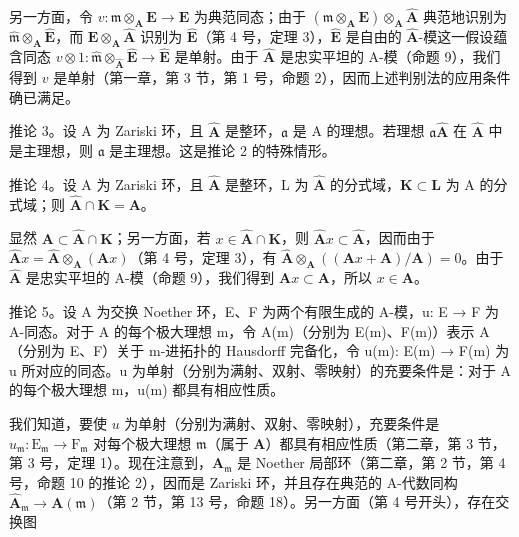另一方面，令 \(v: \mathfrak{m} \otimes_{\mathbf{A}} \mathbf{E} \to \mathbf{E}\) 为典范同态；由于 \((\mathfrak{m} \otimes_{\mathbf{A}} \mathbf{E}) \otimes_{\mathbf{A}} \hat{\mathbf{A}}\) 典范地识别为 \(\hat{\mathfrak{m}} \otimes_{\mathbf{A}} \hat{\mathbf{E}}\)，而 \(\mathbf{E} \otimes_{\mathbf{A}} \hat{\mathbf{A}}\) 识别为 \(\hat{\mathbf{E}}\)（第 4 号，定理 3），\(\hat{\mathbf{E}}\) 是自由的 \(\hat{\mathbf{A}}\)-模这一假设蕴含同态 \(v \otimes 1: \hat{\mathfrak{m}} \otimes_{\hat{\mathbf{A}}} \hat{\mathbf{E}} \to \hat{\mathbf{E}}\) 是单射。由于 \(\hat{\mathbf{A}}\) 是忠实平坦的 A-模（命题 9），我们得到 \(v\) 是单射（第一章，第 3 节，第 1 号，命题 2），因而上述判别法的应用条件确已满足。

推论 3。设 A 为 Zariski 环，且 \(\hat{\mathbf{A}}\) 是整环，\(\mathfrak{a}\) 是 A 的理想。若理想 \(\mathfrak{a}\hat{\mathbf{A}}\) 在 \(\hat{\mathbf{A}}\) 中是主理想，则 \(\mathfrak{a}\) 是主理想。这是推论 2 的特殊情形。

推论 4。设 A 为 Zariski 环，且 \(\hat{\mathbf{A}}\) 是整环，L 为 \(\hat{\mathbf{A}}\) 的分式域，\(\mathbf{K} \subset \mathbf{L}\) 为 A 的分式域；则 \(\hat{\mathbf{A}} \cap \mathbf{K} = \mathbf{A}\)。

显然 \(\mathbf{A} \subset \hat{\mathbf{A}} \cap \mathbf{K}\)；另一方面，若 \(x \in \hat{\mathbf{A}} \cap \mathbf{K}\)，则 \(\hat{\mathbf{A}}x \subset \hat{\mathbf{A}}\)，因而由于 \(\hat{\mathbf{A}}x = \hat{\mathbf{A}} \otimes_{\mathbf{A}} (\mathbf{A}x)\)（第 4 号，定理 3），有 \(\hat{\mathbf{A}} \otimes_{\mathbf{A}} ((\mathbf{A}x + \mathbf{A}) / \mathbf{A}) = 0\)。由于 \(\hat{\mathbf{A}}\) 是忠实平坦的 A-模（命题 9），我们得到 \(\mathbf{A}x \subset \mathbf{A}\)，所以 \(x \in \mathbf{A}\)。

推论 5。设 A 为交换 Noether 环，E、F 为两个有限生成的 A-模，u: E → F 为 A-同态。对于 A 的每个极大理想 m，令 A(m)（分别为 E(m)、F(m)）表示 A（分别为 E、F）关于 m-进拓扑的 Hausdorff 完备化，令 u(m): E(m) → F(m) 为 u 所对应的同态。u 为单射（分别为满射、双射、零映射）的充要条件是：对于 A 的每个极大理想 m，u(m) 都具有相应性质。

我们知道，要使 \(u\) 为单射（分别为满射、双射、零映射），充要条件是 \(u_{\mathfrak{m}}: \mathrm{E}_{\mathfrak{m}} \to \mathrm{F}_{\mathfrak{m}}\) 对每个极大理想 \(\mathfrak{m}\)（属于 \(\mathbf{A}\)）都具有相应性质（第二章，第 3 节，第 3 号，定理 1）。现在注意到，\(\mathbf{A}_{\mathfrak{m}}\) 是 Noether 局部环（第二章，第 2 节，第 4 号，命题 10 的推论 2），因而是 Zariski 环，并且存在典范的 A-代数同构 \(\hat{\mathbf{A}}_{\mathfrak{m}} \to \mathbf{A}(\mathfrak{m})\)（第 2 节，第 13 号，命题 18）。另一方面（第 4 号开头），存在交换图

